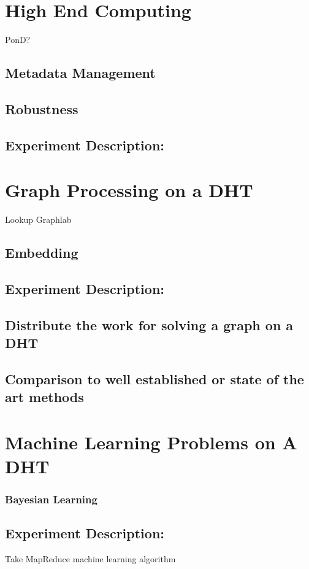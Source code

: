 \documentclass[10pt,letterpaper,twoside]{report}
\begin{document}
\section{High End Computing}
PonD?
\subsection{Metadata Management}
\subsection{Robustness}

\subsection{Experiment Description:}

\section{Graph Processing on a DHT}
Lookup Graphlab
\subsection{Embedding}

\subsection{Experiment Description:}
\subsection{Distribute the work for solving a graph on a DHT}
\subsection{Comparison to well established or state of the art methods}



\section{Machine Learning Problems on A DHT}


\subsubsection{Bayesian Learning}
\subsection{Experiment Description:}
Take MapReduce machine learning algorithm
\end{document}
